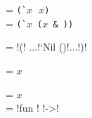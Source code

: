 \documentclass{article}
\begin{document}

 = \verb|(`|$x\texttt{ }x$\verb|)| \\
 = \verb|(`|$x$\verb! (!$x$\verb| & |\verb|))| \\


 = \listhd{}\lbonion\listtl \lbil!(!\listhd{} \listtl $\ldots$\listtl\lbil!`Nil ()!$\ldots$\lbil!)! \\


 = \bt$x$\verb| | \\


 = \bt$x$\verb| | \\
 = \lbil!fun ! \lbil!->!  \\
\end{document}
